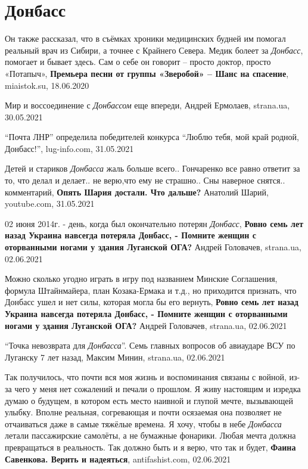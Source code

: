  
 
 
 
 
\chapter{Донбасс}

Он также рассказал, что в съёмках хроники медицинских будней им помогал
реальный врач из Сибири, а точнее с Крайнего Севера. Медик болеет за
\emph{Донбасс}, помогает и бывает здесь. Сам о себе он говорит – просто доктор,
просто «Потапыч», \textbf{Премьера песни от группы «Зверобой» – Шанс на
спасение}, miaistok.su, 18.06.2020

Мир и воссоединение с \emph{Донбассом} еще впереди, Андрей Ермолаев, strana.ua,
30.05.2021

\enquote{Почта ЛНР} определила победителей конкурса \enquote{Люблю тебя, мой
край родной, Донбасс!}, lug-info.com, 31.05.2021

Детей и стариков \emph{Донбасса} жаль больше всего.. Гончаренко все равно ответит за
то, что делал и делает.. не верю,что ему не страшно.. Сны наверное снятся..
комментарий, \textbf{Опять Шария достали. Что дальше?} Анатолий Шарий, youtube.com, 31.05.2021

02 июня 2014г. - день, когда был окончательно потерян \emph{Донбасс},
\textbf{Ровно семь лет назад Украина навсегда потеряла Донбасс, - Помните женщин с оторванными ногами у здания Луганской ОГА?} 
Андрей Головачев, strana.ua, 02.06.2021

Можно сколько угодно играть в игру под названием Минские Соглашения, формула
Штайнмайера, план Козака-Ермака и т.д., но приходится признать, что Донбасс
ушел и нет силы, которая могла бы его вернуть,
\textbf{Ровно семь лет назад Украина навсегда потеряла Донбасс, - Помните женщин с оторванными ногами у здания Луганской ОГА?} 
Андрей Головачев, strana.ua, 02.06.2021

\enquote{Точка невозврата для \emph{Донбасса}}. Семь главных вопросов об авиаударе ВСУ по Луганску 7 лет назад,
Максим Минин, strana.ua, 02.06.2021

Так получилось, что почти вся моя жизнь и воспоминания связаны с войной, из-за
чего у меня нет сожалений и печали о прошлом. Я живу настоящим и изредка думаю
о будущем, в котором есть место наивной и глупой мечте, вызывающей улыбку.
Вполне реальная, согревающая и почти осязаемая она позволяет не отчаиваться
даже в самые тяжёлые времена. Я хочу, чтобы в небе \emph{Донбасса} летали пассажирские
самолёты, а не бумажные фонарики. Любая мечта должна превращаться в реальность.
Так должно быть и я верю, что так и будет,
\textbf{Фаина Савенкова. Верить и надеяться}, antifashist.com, 02.06.2021



